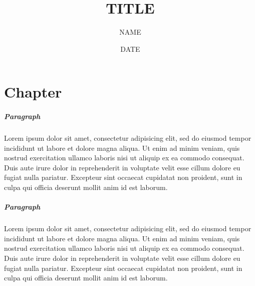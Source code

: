 \documentclass[a5paper, 10pt]{book}
\begin{document}

    	\linespread{1}
		\graphicspath{ {./img/} }
		\renewcommand*\rmdefault{iwona}



	\title{TITLE}
	\author{NAME}
	\date{DATE}


	\BgUsefalse

	\maketitle



	\chapter{Chapter}
	\BgUsetrue

	\paragraph{Paragraph} Lorem ipsum dolor sit amet, consectetur adipisicing elit, sed do eiusmod tempor incididunt ut labore et dolore magna aliqua. Ut enim ad minim veniam, quis nostrud exercitation ullamco laboris nisi ut aliquip ex ea commodo consequat. Duis aute irure dolor in reprehenderit in voluptate velit esse cillum dolore eu fugiat nulla pariatur. Excepteur sint occaecat cupidatat non proident, sunt in culpa qui officia deserunt mollit anim id est laborum.

	\paragraph{Paragraph} Lorem ipsum dolor sit amet, consectetur adipisicing elit, sed do eiusmod tempor incididunt ut labore et dolore magna aliqua. Ut enim ad minim veniam, quis nostrud exercitation ullamco laboris nisi ut aliquip ex ea commodo consequat. Duis aute irure dolor in reprehenderit in voluptate velit esse cillum dolore eu fugiat nulla pariatur. Excepteur sint occaecat cupidatat non proident, sunt in culpa qui officia deserunt mollit anim id est laborum.
\end{document}
